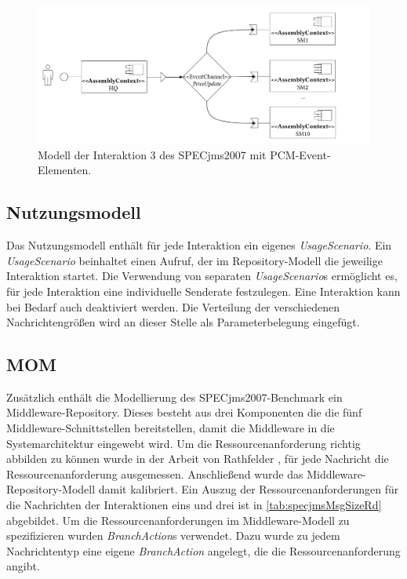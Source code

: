 \begin{figure}
\center
  \includegraphics[width=1\textwidth]{images/evaluation/specjms/evaluationInteraktion3events.pdf}
  \caption{Modell der Interaktion 3 des SPECjms2007 mit PCM-Event-Elementen.}
  \label{img:interaction3system}
\end{figure}


\subsection{Nutzungsmodell}
Das Nutzungsmodell enthält für jede Interaktion ein eigenes \emph{UsageScenario}. Ein \emph{UsageScenario} beinhaltet einen Aufruf, der im Repository-Modell die jeweilige Interaktion startet. Die Verwendung von separaten \emph{UsageScenario}s ermöglicht es, für jede Interaktion eine individuelle Senderate festzulegen. Eine Interaktion kann bei Bedarf auch deaktiviert werden. Die Verteilung der verschiedenen Nachrichtengrößen wird an dieser Stelle als Parameterbelegung eingefügt.

\subsection{MOM}
Zusätzlich enthält die Modellierung des SPECjms2007-Benchmark ein Middleware-Repository. Dieses besteht aus drei Komponenten die die fünf Middleware-Schnittstellen bereitstellen, damit die Middleware in die Systemarchitektur eingewebt wird. Um die Ressourcenanforderung richtig abbilden zu können wurde in der Arbeit von Rathfelder \cite{Rathfelder2013}, für jede Nachricht die Ressourcenanforderung ausgemessen. Anschließend wurde das Middleware-Repository-Modell damit kalibriert. Ein Auszug der Ressourcenanforderungen für die Nachrichten der Interaktionen eins und drei ist in \autoref{tab:specjmsMsgSizeRd} abgebildet. Um die Ressourcenanforderungen im Middleware-Modell zu spezifizieren wurden \emph{BranchAction}s verwendet. Dazu wurde zu jedem Nachrichtentyp eine eigene \emph{BranchAction} angelegt, die die Ressourcenanforderung angibt. 

